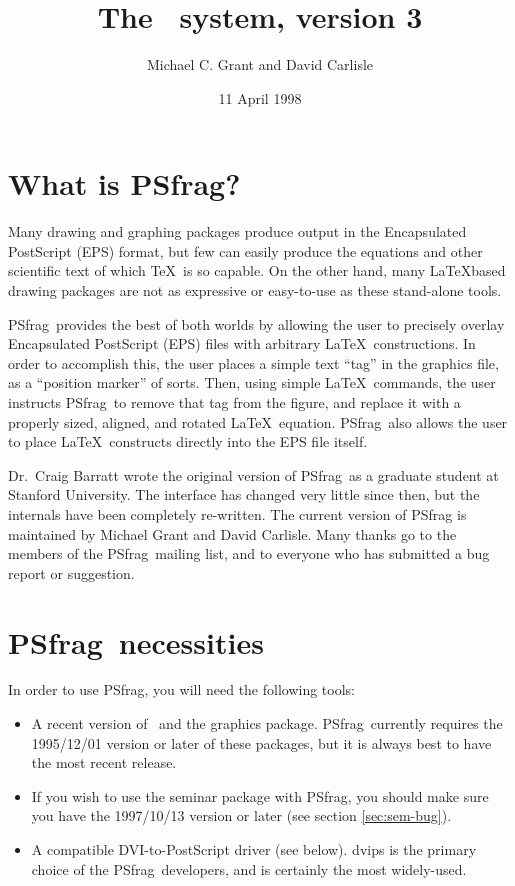 \documentclass[11pt]{ltxguide}
\title{The \pfg\ system, version 3}
\author{Michael C. Grant and David Carlisle\\
        \netaddress{psfrag@rascals.stanford.edu}}
\date{11 April 1998}
\let\pkg\textsf
\newcommand{\pfg}{\pkg{PSfrag}}
\begin{document}
\maketitle
\tableofcontents

\section{What is \pfg?}

Many drawing and graphing packages produce output in the Encapsulated
PostScript (EPS) format, but few can easily produce the equations and other
scientific text of which \TeX\ is so capable. On the other hand, many
\LaTeX\-based drawing packages are not as expressive or easy-to-use as these
stand-alone tools.

\pfg\ provides the best of both worlds by allowing the user to precisely
overlay Encapsulated PostScript (EPS) files with arbitrary \LaTeX\
constructions. In order to accomplish this, the user places a simple text
``tag'' in the graphics file, as a ``position marker'' of sorts. Then, using
simple \LaTeX\ commands, the user instructs \pfg\ to remove that tag from the
figure, and replace it with a properly sized, aligned, and rotated \LaTeX\
equation. \pfg\ also allows the user to place \LaTeX\ constructs directly into
the EPS file itself.

Dr.\ Craig Barratt wrote the original version of \pfg\ as a graduate student at
Stanford University. The interface has changed very little since then, but the
internals have been completely re-written. The current version of PSfrag is
maintained by Michael Grant and David Carlisle. Many thanks go to the members
of the \pfg\ mailing list, and to everyone who has submitted a bug report or
suggestion.

\section{\pfg\ necessities}

In order to use \pfg, you will need the following tools:
\begin{itemize}
\item A recent version of \LaTeXe\ and the \pkg{graphics} package.
	  \pfg\ currently requires the 1995/12/01 version or later of these
	  packages, but it is always best to have the most recent release.
\item If you wish to use the \pkg{seminar} package with \pfg, you
	  should make sure you have the 1997/10/13 version or later (see
	  section \ref{sec:sem-bug}).
\item A compatible DVI-to-PostScript driver (see below). \pkg{dvips} is
	  the primary choice of the \pfg\ developers, and is certainly the
 	  most widely-used.
\end{itemize}
\end{document}
